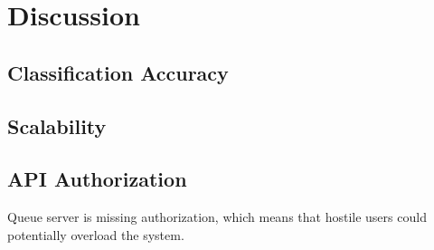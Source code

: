 \chapter{Discussion}\label{cha:disc}

\section{Classification Accuracy}

\section{Scalability}

\section{\acs{API} Authorization}\label{disc:auth}
Queue server is missing authorization, which means that hostile users could
potentially overload the system.
